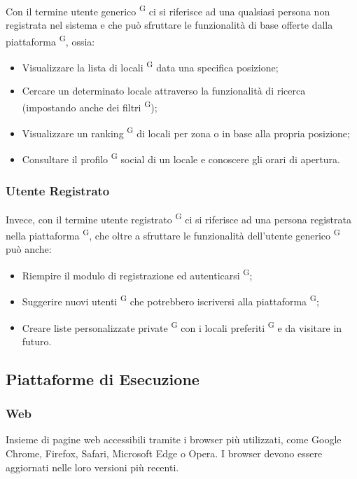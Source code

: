 Con il termine utente generico \textsuperscript{G} ci si riferisce ad una qualsiasi persona non registrata nel sistema e che può sfruttare le funzionalità di base offerte dalla piattaforma \textsuperscript{G}, ossia:

\begin{itemize}
  \item Visualizzare la lista di locali \textsuperscript{G} data una specifica posizione;
  \item Cercare un determinato locale attraverso la funzionalità di ricerca (impostando anche dei filtri \textsuperscript{G});
  \item Visualizzare un ranking \textsuperscript{G} di locali per zona o in base alla propria posizione;
  \item Consultare il profilo \textsuperscript{G} social di un locale e conoscere gli orari di apertura.
\end{itemize}

\subsubsection{Utente Registrato}

Invece, con il termine utente registrato \textsuperscript{G} ci si riferisce ad una persona registrata nella piattaforma \textsuperscript{G}, che oltre a sfruttare le funzionalità dell’utente generico \textsuperscript{G} può anche:

\begin{itemize}
  \item Riempire il modulo di registrazione ed autenticarsi \textsuperscript{G};
  \item Suggerire nuovi utenti \textsuperscript{G} che potrebbero iscriversi alla piattaforma \textsuperscript{G};
  \item Creare liste personalizzate private \textsuperscript{G} con i locali preferiti \textsuperscript{G} e da visitare in futuro.
\end{itemize}

\subsection{Piattaforme di Esecuzione}

\subsubsection{Web}
Insieme di pagine web accessibili tramite i browser più utilizzati, come Google Chrome, Firefox, Safari, Microsoft Edge o Opera. I browser devono essere aggiornati nelle loro versioni più recenti.

